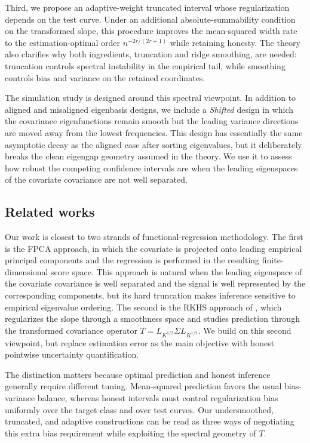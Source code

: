 \documentclass[aos]{imsart}
\theoremstyle{plain}
\theoremstyle{definition}
\theoremstyle{definition}
\begin{document}
Third, we propose an adaptive-weight truncated interval whose regularization depends on the test curve. Under an additional absolute-summability condition on the transformed slope, this procedure improves the mean-squared width rate to the estimation-optimal order $n^{-2r/(2r+1)}$ while retaining honesty. The theory also clarifies why both ingredients, truncation and ridge smoothing, are needed: truncation controls spectral instability in the empirical tail, while smoothing controls bias and variance on the retained coordinates.

The simulation study is designed around this spectral viewpoint. In addition to aligned and misaligned eigenbasis designs, we include a \emph{Shifted} design in which the covariance eigenfunctions remain smooth but the leading variance directions are moved away from the lowest frequencies. This design has essentially the same asymptotic decay as the aligned case after sorting eigenvalues, but it deliberately breaks the clean eigengap geometry assumed in the theory. We use it to assess how robust the competing confidence intervals are when the leading eigenspaces of the covariate covariance are not well separated.

\subsection{Related works}

Our work is closest to two strands of functional-regression methodology. The first is the FPCA approach, in which the covariate is projected onto leading empirical principal components and the regression is performed in the resulting finite-dimensional score space. This approach is natural when the leading eigenspace of the covariate covariance is well separated and the signal is well represented by the corresponding components, but its hard truncation makes inference sensitive to empirical eigenvalue ordering. The second is the RKHS approach of \cite{yuan2010reproducing,cai2012minimax}, which regularizes the slope through a smoothness space and studies prediction through the transformed covariance operator $T=L_{K^{1/2}}\Sigma L_{K^{1/2}}$. We build on this second viewpoint, but replace estimation error as the main objective with honest pointwise uncertainty quantification.

The distinction matters because optimal prediction and honest inference generally require different tuning. Mean-squared prediction favors the usual bias-variance balance, whereas honest intervals must control regularization bias uniformly over the target class and over test curves. Our undersmoothed, truncated, and adaptive constructions can be read as three ways of negotiating this extra bias requirement while exploiting the spectral geometry of $T$.
\end{document}
